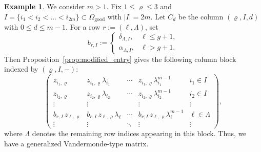 \documentclass[12pt, letterpaper]{amsart}
\theoremstyle{definition}
\newtheorem{example}[theorem]{Example}
\newcommand{\Om}{\Omega}
\newcommand{\lbd}{\lambda}
\begin{document}
\begin{example}\label{ex:rk3_vandermonde}
We consider \(m > 1\). Fix \(1\le \varrho\le 3\) and \(I = \{i_1 < i_2 < \dots < i_{2m}\} \subset\Om_{\mathrm{good}}\) with \(|I|=2m\). Let \(C_d\) be the column \((\varrho, I, d)\) with \(0 \le d \le m-1\). For a row \(r := (\ell, \Lambda)\), set
\[b_{r, I} := \begin{cases} \delta_{\Lambda, I}, & \ell \le g+1,\\ \alpha_{\Lambda, I}, & \ell > g+1. \end{cases}\]
Then Proposition~\ref{prop:modified_entry} gives the following column block indexed by \((\varrho, I, -)\):
\[
\left( \begin{array}{cccc|c}
  z_{i_1,\varrho} & z_{i_1,\varrho}\lbd_{i_1} & \cdots & z_{i_1,\varrho}\lbd_{i_1}^{m-1} & i_1\in I\\
  z_{i_2,\varrho} & z_{i_2,\varrho}\lbd_{i_2} & \cdots & z_{i_2,\varrho}\lbd_{i_2}^{m-1} & i_2\in I\\
  \vdots & \vdots && \vdots & \vdots\\
  b_{r, I}\,z_{\ell,\varrho} & b_{r, I}\,z_{\ell,\varrho}\lbd_\ell & \cdots & b_{r, I}\,z_{\ell,\varrho}\lbd_\ell^{m-1} & \ell\in\Lambda\\
  \vdots & \vdots & \ddots & \vdots & \vdots
\end{array} \right),
\]
where \(\Lambda\) denotes the remaining row indices appearing in this block. Thus, we have a generalized Vandermonde-type matrix.


\end{example}
\end{document}
